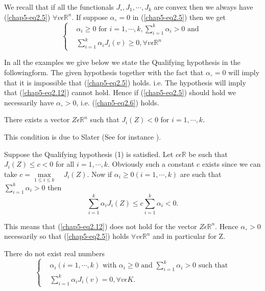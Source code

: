 \medskip
{} We recall that if all the functionals $J_{\circ}, J_{1}, \cdots , J_{k}$ are convex then we always have (\ref{chap5-eq2.5}) $\forall v \epsilon \mathbb{R}^{n}$. If suppose $\alpha_{\circ} = 0$ in (\ref{chap5-eq2.5}) then we get
\begin{equation*}
\begin{cases}
& \alpha_{i} \geq 0 \text{ for } i = 1, \cdots, k, \sum\limits_{i=1}^{k} \alpha_{i} > 0 \text{ and }\\
& \sum\limits_{i=1}^{k} \alpha_{i} J_{i} (v) \geq 0, \forall v \epsilon \mathbb{R}^{n}
\end{cases} \tag{2.12}\label{chap5-eq2.12}
\end{equation*}

In all the examples we give below we state the Qualifying hypothesis
in the following\pageoriginale form. The given hypothesis together
with the fact that $\alpha_{\circ} = 0$ will imply that it is
impossible that (\ref{chap5-eq2.5}) holds. i.e. The hypothesis will
imply that (\ref{chap5-eq2.12}) cannot hold. Hence if
(\ref{chap5-eq2.5}) should hold we necessarily have $\alpha_{\circ} >
0$, i.e. (\ref{chap5-eq2.6}) holds. 

\medskip
{} There exists a vector $Z \epsilon \mathbb{R}^{n}$ such that $J_{i}(Z) < 0$ for $i = 1, \cdots, k$.

This condition is due to Slater (See for instance \cite{key6}).

Suppose the Qualifying hypothesis (1) is satisfied. Let $c \epsilon \mathbb{R}$ be such that $J_{i}(Z) \leq c < 0$ for all $i = 1, \cdots , k$. Obviously such a constant c exists since we can take $c = \max\limits_{1 \leq i \leq k} \quad J_{i} (Z)$. Now if $\alpha_{i} \geq 0 (i = 1, \cdots , k)$ are such that $\sum\limits_{i=1}^{k} \alpha_{i} > 0$ then 
$$
\sum\limits_{i=1}^{k} \alpha_{i} J_{i} (Z) \leq c \sum\limits_{i=1}^{k} \alpha_{i} < 0.
$$

This means that (\ref{chap5-eq2.12}) does not hold for the vector $Z
\epsilon \mathbb{R}^{n}$. Hence $\alpha_{\circ} > 0$ necessarily so
that (\ref{chap5-eq2.5}) holds $\forall v \epsilon \mathbb{R}^{n}$ and
in particular for Z. 

\medskip
{} There do not exist real numbers
\begin{equation*}
\begin{cases}
& \alpha_{i} (i = 1, \cdots, k) \text{ with } \alpha_{i} \geq 0 \text{ and } \sum\limits_{i=1}^{k} \alpha_{i} > 0 \text{ such that}\\
& \sum\limits_{i=1}^{k} \alpha_{i} J_{i} (v) = 0, \forall v \epsilon K.\tag{2.13}\label{chap5-eq2.13}
\end{cases}
\end{equation*}

